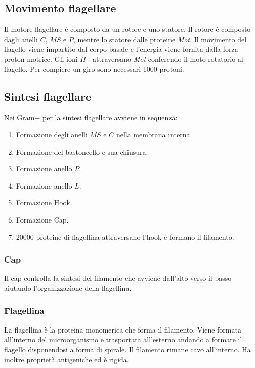 	\subsection{Movimento flagellare}
	Il motore flagellare \`e composto da un rotore e uno statore.
	Il rotore \`e composto dagli anelli $C$, $MS$ e $P$, mentre lo statore dalle proteine \emph{Mot}.
	Il movimento del flagello viene impartito dal corpo basale e l'energia viene fornita dalla forza proton-motrice.
	Gli ioni \emph{$H^+$} attraversano \emph{Mot} conferendo il moto rotatorio al flagello.
	Per compiere un giro sono necessari \num{1000} protoni.

	\subsection{Sintesi flagellare}
	Nei Gram$-$ per la sintesi flagellare avviene in sequenza:
	\begin{multicols}{3}
		\begin{enumerate}
			\item Formazione degli anelli $MS$ e $C$ nella membrana interna.
			\item Formazione del bastoncello e sua chiusura.
			\item Formazione anello $P$.
			\item Formazione anello $L$.
			\item Formazione Hook.
			\item Formazione Cap.
			\item \num{20000} proteine di flagellina attraversano l'hook e formano il filamento.
		\end{enumerate}
	\end{multicols}

		\subsubsection{Cap}
		Il cap controlla la sintesi del filamento che avviene dall'alto verso il basso aiutando l'organizzazione della flagellina.

		\subsubsection{Flagellina}
		La flagellina \`e la proteina monomerica che forma il filamento.
		Viene formata all'interno del microorganismo e trasportata all'esterno andando a formare il flagello disponendosi a forma di spirale.
		Il filamento rimane cavo all'interno.
		Ha inoltre propriet\`a antigeniche ed \`e rigida.

